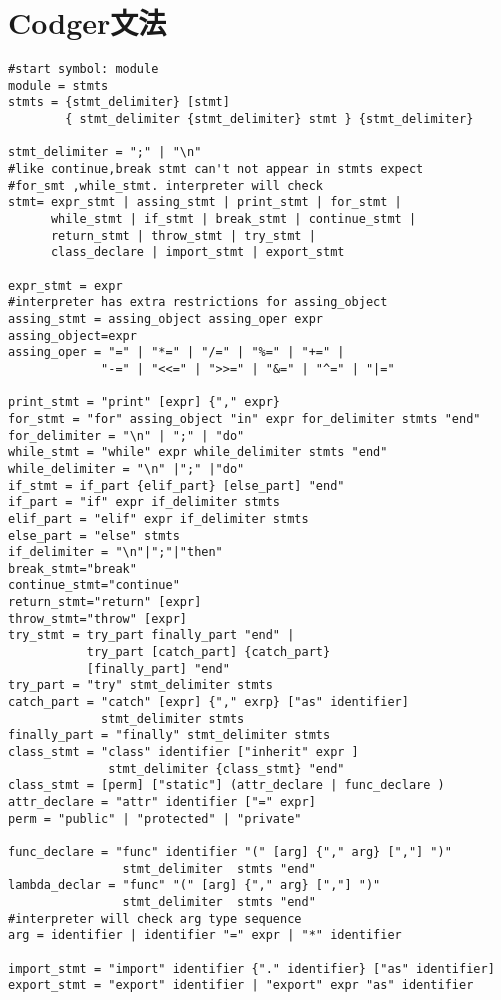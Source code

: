 \section{Codger文法}
\begin{verbatim}
#start symbol: module 
module = stmts
stmts = {stmt_delimiter} [stmt] 
        { stmt_delimiter {stmt_delimiter} stmt } {stmt_delimiter}
       
stmt_delimiter = ";" | "\n"
#like continue,break stmt can't not appear in stmts expect 
#for_smt ,while_stmt. interpreter will check  
stmt= expr_stmt | assing_stmt | print_stmt | for_stmt |
      while_stmt | if_stmt | break_stmt | continue_stmt |
      return_stmt | throw_stmt | try_stmt | 
      class_declare | import_stmt | export_stmt 

expr_stmt = expr 
#interpreter has extra restrictions for assing_object
assing_stmt = assing_object assing_oper expr 
assing_object=expr
assing_oper = "=" | "*=" | "/=" | "%=" | "+=" |
             "-=" | "<<=" | ">>=" | "&=" | "^=" | "|="
              
print_stmt = "print" [expr] {"," expr}
for_stmt = "for" assing_object "in" expr for_delimiter stmts "end"
for_delimiter = "\n" | ";" | "do"
while_stmt = "while" expr while_delimiter stmts "end"
while_delimiter = "\n" |";" |"do"
if_stmt = if_part {elif_part} [else_part] "end"
if_part = "if" expr if_delimiter stmts 
elif_part = "elif" expr if_delimiter stmts
else_part = "else" stmts
if_delimiter = "\n"|";"|"then"
break_stmt="break"
continue_stmt="continue"
return_stmt="return" [expr]
throw_stmt="throw" [expr]
try_stmt = try_part finally_part "end" |
           try_part [catch_part] {catch_part}
           [finally_part] "end"
try_part = "try" stmt_delimiter stmts
catch_part = "catch" [expr] {"," exrp} ["as" identifier]
             stmt_delimiter stmts
finally_part = "finally" stmt_delimiter stmts
class_stmt = "class" identifier ["inherit" expr ] 
              stmt_delimiter {class_stmt} "end"
class_stmt = [perm] ["static"] (attr_declare | func_declare )
attr_declare = "attr" identifier ["=" expr]
perm = "public" | "protected" | "private" 

func_declare = "func" identifier "(" [arg] {"," arg} [","] ")"
                stmt_delimiter  stmts "end"
lambda_declar = "func" "(" [arg] {"," arg} [","] ")"
                stmt_delimiter  stmts "end"
#interpreter will check arg type sequence
arg = identifier | identifier "=" expr | "*" identifier  

import_stmt = "import" identifier {"." identifier} ["as" identifier]
export_stmt = "export" identifier | "export" expr "as" identifier


\end{verbatim}
